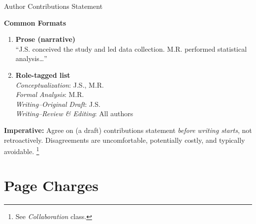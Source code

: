 \documentclass{beamer}
\begin{document}
\begin{frame}{Author Contributions Statement}

      \textbf{Common Formats}
      \medskip
      \begin{enumerate}
        \item \textbf{Prose (narrative)}\\
          \small ``J.S. conceived the study and led data collection.
          M.R. performed statistical analysis\ldots''

        \bigskip

        \item \textbf{Role-tagged list}\\
          \small \textit{Conceptualization}: J.S., M.R.\\
          \textit{Formal Analysis}: M.R.\\
          \textit{Writing--Original Draft}: J.S.\\
          \textit{Writing--Review \& Editing}: All authors
      \end{enumerate}

      \bigskip

      \alert{\textbf{Imperative:}} Agree on (a draft) contributions statement \emph{before writing starts}, not retroactively. 
      Disagreements are uncomfortable, potentially costly, and typically avoidable.%
      \footnote{See \emph{Collaboration} class.}

\end{frame}

\section{Page Charges}
\end{document}
